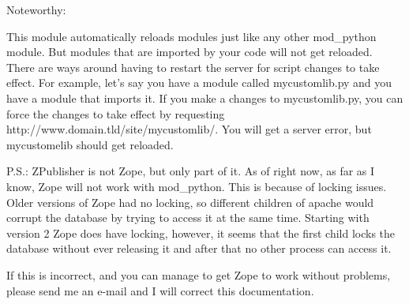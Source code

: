 Noteworthy:
 
This module automatically reloads modules just like any other
mod_python module. But modules that are imported by your code will not
get reloaded.  There are ways around having to restart the server for
script changes to take effect. For example, let's say you have a
module called mycustomlib.py and you have a module that imports it. If
you make a changes to mycustomlib.py, you can force the changes to
take effect by requesting http://www.domain.tld/site/mycustomlib/.
You will get a server error, but mycustomelib should get reloaded.
 
P.S.: ZPublisher is not Zope, but only part of it. As of right now, as
far as I know, Zope will not work with mod_python. This is because of
locking issues. Older versions of Zope had no locking, so different
children of apache would corrupt the database by trying to access it
at the same time.  Starting with version 2 Zope does have locking,
however, it seems that the first child locks the database without ever
releasing it and after that no other process can access it.

If this is incorrect, and you can manage to get Zope to work without
problems, please send me an e-mail and I will correct this
documentation.

